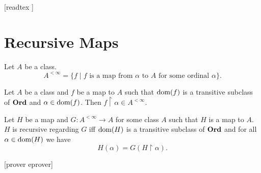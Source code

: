 \documentclass[10pt]{article}
\begin{document}
  \begin{imports}
    \begin{forthel}
      [readtex ]
    \end{forthel}
  \end{imports}


  \section*{Recursive Maps}

  \begin{forthel}
    \begin{definition}
      Let $A$ be a class.
      \[ A^{< \infty} = \{f \mid \text{$f$ is a map from $\alpha$ to $A$ for some ordinal $\alpha$} \}. \]
    \end{definition}
  \end{forthel}

  \begin{forthel}
    \begin{proposition}
      Let $A$ be a class and $f$ be a map to $A$ such that $\operatorname{dom}(f)$ is a transitive subclass of $\textbf{Ord}$ and $\alpha \in \operatorname{dom}(f)$.
      Then $f \restriction \alpha \in A^{< \infty}$.
    \end{proposition}
  \end{forthel}

  \begin{forthel}
    \begin{definition}
      Let $H$ be a map and $G : A^{< \infty} \to A$ for some class $A$ such that $H$ is a map to $A$.
      $H$ is recursive regarding $G$ iff $\operatorname{dom}(H)$ is a transitive subclass of $\textbf{Ord}$ and for all $\alpha \in \operatorname{dom}(H)$ we have \[ H(\alpha) = G(H \restriction \alpha). \]
    \end{definition}
    [prover eprover]
  \end{forthel}
\end{document}
